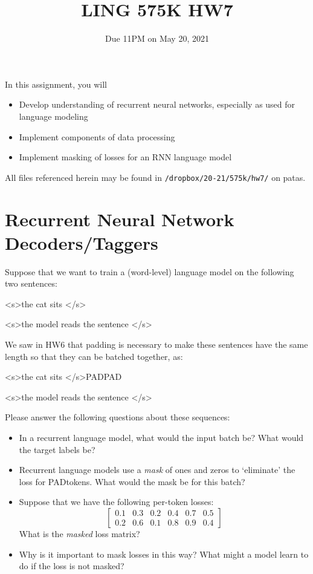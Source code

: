 \documentclass[11pt]{article}
\newcommand{\bos}{\textless s\textgreater\:}
\newcommand{\eos}{\textless /s\textgreater\:}
\newcommand{\pad}{PAD\:}
\begin{document}
\title{LING 575K HW7}
\date{\vspace{-0.2in}Due 11PM on May 20, 2021}
\maketitle


\noindent In this assignment, you will 
\begin{itemize}
  \item Develop understanding of recurrent neural networks, especially as used for language modeling
  \item Implement components of data processing 
  \item Implement masking of losses for an RNN language model
\end{itemize}
All files referenced herein may be found in \texttt{/dropbox/20-21/575k/hw7/} on patas.


\section{Recurrent Neural Network Decoders/Taggers}

  Suppose that we want to train a (word-level) language model on the following two sentences:
\begin{center}
  \bos the cat sits \eos

  \bos the model reads the sentence \eos
\end{center}
We saw in HW6 that padding is necessary to make these sentences have the same length so that they can be batched together, as:
\begin{center}
  \bos the cat sits \eos \pad \pad

  \bos the model reads the sentence \eos
\end{center}
Please answer the following questions about these sequences:
\begin{itemize}
  \item In a recurrent language model, what would the input batch be?  What would the target labels be? 
  \item Recurrent language models use a \emph{mask} of ones and zeros to `eliminate' the loss for \pad tokens.  What would the mask be for this batch?
  \item Suppose that we have the following per-token losses:
    \[ \begin{bmatrix} 0.1 & 0.3 & 0.2 & 0.4 & 0.7 & 0.5 \\ 0.2 & 0.6 & 0.1 & 0.8 & 0.9 & 0.4 \end{bmatrix} \]
    What is the \emph{masked} loss matrix?
  \item Why is it important to mask losses in this way?  What might a model learn to do if the loss is not masked?
\end{itemize}
\end{document}

